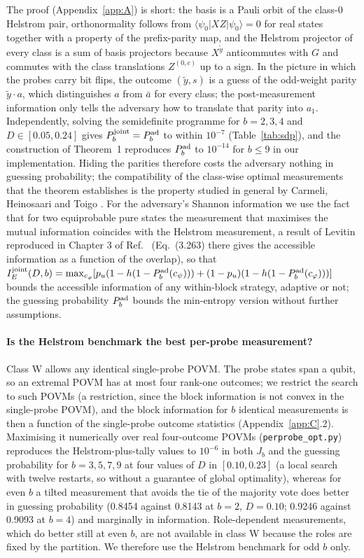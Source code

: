 \documentclass[aps,pra,twocolumn,superscriptaddress,nofootinbib]{revtex4-2}
\begin{document}
The proof (Appendix~\ref{app:A}) is short: the basis is a Pauli orbit of the class-0 Helstrom pair, orthonormality follows from $\langle\psi_0|XZ|\psi_0\rangle=0$ for real states together with a property of the prefix-parity map, and the Helstrom projector of every class is a sum of basis projectors because $X^{\tilde y}$ anticommutes with $G$ and commutes with the class translations $Z^{(0,c)}$ up to a sign. In the picture in which the probes carry bit flips, the outcome $(\tilde y,s)$ is a guess of the odd-weight parity $\tilde y\cdot a$, which distinguishes $a$ from $\bar a$ for every class; the post-measurement information only tells the adversary how to translate that parity into $a_1$. Independently, solving the semidefinite programme for $b=2,3,4$ and $D\in[0.05,0.24]$ gives $P^{\rm joint}_b=P^{\rm ad}_b$ to within $10^{-7}$ (Table~\ref{tab:sdp}), and the construction of Theorem~1 reproduces $P^{\rm ad}_b$ to $10^{-14}$ for $b\le9$ in our implementation. Hiding the parities therefore costs the adversary nothing in guessing probability; the compatibility of the class-wise optimal measurements that the theorem establishes is the property studied in general by Carmeli, Heinosaari and Toigo \cite{CHT18}. For the adversary's Shannon information we use the fact that for two equiprobable pure states the measurement that maximises the mutual information coincides with the Helstrom measurement, a result of Levitin \cite{Levitin95} reproduced in Chapter 3 of Ref.~\cite{Fuchs96} (Eq.~(3.263) there gives the accessible information as a function of the overlap), so that $I_E^{\rm joint}(D,b)=\max_{c_\varphi}[p_u(1-h(1-P^{\rm ad}_b(c_\psi)))+(1-p_u)(1-h(1-P^{\rm ad}_b(c_\varphi)))]$ bounds the accessible information of any within-block strategy, adaptive or not; the guessing probability $P^{\rm ad}_b$ bounds the min-entropy version without further assumptions.

\paragraph*{Is the Helstrom benchmark the best per-probe measurement?} Class W allows any identical single-probe POVM. The probe states span a qubit, so an extremal POVM has at most four rank-one outcomes; we restrict the search to such POVMs (a restriction, since the block information is not convex in the single-probe POVM), and the block information for $b$ identical measurements is then a function of the single-probe outcome statistics (Appendix~\ref{app:C}.2). Maximising it numerically over real four-outcome POVMs (\texttt{perprobe\_opt.py}) reproduces the Helstrom-plus-tally values to $10^{-6}$ in both $J_b$ and the guessing probability for $b=3,5,7,9$ at four values of $D$ in $[0.10,0.23]$ (a local search with twelve restarts, so without a guarantee of global optimality), whereas for even $b$ a tilted measurement that avoids the tie of the majority vote does better in guessing probability (0.8454 against 0.8143 at $b=2$, $D=0.10$; 0.9246 against 0.9093 at $b=4$) and marginally in information. Role-dependent measurements, which do better still at even $b$, are not available in class W because the roles are fixed by the partition. We therefore use the Helstrom benchmark for odd $b$ only.
\end{document}
